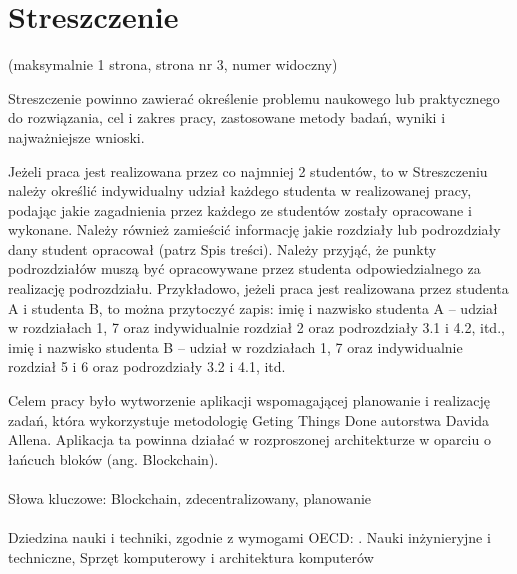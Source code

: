 \chapter*{Streszczenie}
\thispagestyle{plain}

(maksymalnie 1 strona, strona nr 3, numer widoczny)

Streszczenie powinno zawierać określenie problemu naukowego lub praktycznego do rozwiązania, cel i zakres pracy, zastosowane metody badań, wyniki i najważniejsze wnioski.

Jeżeli praca jest realizowana przez co najmniej 2 studentów, to w Streszczeniu należy określić indywidualny udział każdego studenta w realizowanej pracy, podając jakie zagadnienia przez każdego ze studentów zostały opracowane i wykonane. Należy również zamieścić informację jakie rozdziały lub podrozdziały dany student opracował (patrz Spis treści). Należy przyjąć, że punkty podrozdziałów muszą być opracowywane przez studenta odpowiedzialnego za realizację podrozdziału. Przykładowo, jeżeli praca jest realizowana przez studenta A i studenta B, to można przytoczyć zapis: imię i nazwisko studenta A – udział w rozdziałach 1, 7 oraz indywidualnie rozdział 2 oraz podrozdziały 3.1 i 4.2, itd., imię i nazwisko studenta B – udział w rozdziałach 1, 7 oraz indywidualnie rozdział 5 i 6 oraz podrozdziały 3.2 i 4.1, itd.

Celem pracy było wytworzenie aplikacji wspomagającej planowanie i realizację zadań, która wykorzystuje metodologię Geting Things Done autorstwa Davida Allena. Aplikacja ta powinna działać w rozproszonej architekturze w oparciu o łańcuch bloków (ang. Blockchain). 
\\\\
Słowa kluczowe: Blockchain, zdecentralizowany, planowanie
\\\\
Dziedzina nauki i techniki, zgodnie z wymogami OECD: . Nauki inżynieryjne i techniczne, Sprzęt komputerowy i architektura komputerów
